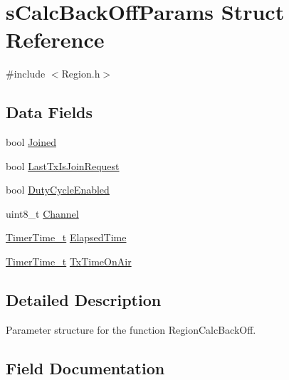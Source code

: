 \hypertarget{structsCalcBackOffParams}{}\section{s\+Calc\+Back\+Off\+Params Struct Reference}
\label{structsCalcBackOffParams}


{\ttfamily \#include $<$Region.\+h$>$}

\subsection*{Data Fields}
\begin{DoxyCompactItemize}
\item 
bool \hyperlink{structsCalcBackOffParams_aa738e3fae7d7ab3f38641f9b72707993}{Joined}
\item 
bool \hyperlink{structsCalcBackOffParams_a11dd44f1674947f4dffdf6b7d18f41a2}{Last\+Tx\+Is\+Join\+Request}
\item 
bool \hyperlink{structsCalcBackOffParams_a4bea532b6e9e4114703af8783638cd8f}{Duty\+Cycle\+Enabled}
\item 
uint8\+\_\+t \hyperlink{structsCalcBackOffParams_a99a6c0a03d4d1b28145baef240f769dd}{Channel}
\item 
\hyperlink{utilities_8h_a4215ca43d3e953099ea758ce428599d0}{Timer\+Time\+\_\+t} \hyperlink{structsCalcBackOffParams_a944eee5d4b307ea37de08f610004b484}{Elapsed\+Time}
\item 
\hyperlink{utilities_8h_a4215ca43d3e953099ea758ce428599d0}{Timer\+Time\+\_\+t} \hyperlink{structsCalcBackOffParams_a90a1f5a96d10105fc2229e5c76393fd0}{Tx\+Time\+On\+Air}
\end{DoxyCompactItemize}


\subsection{Detailed Description}
Parameter structure for the function Region\+Calc\+Back\+Off. 

\subsection{Field Documentation}
\mbox{\label{structsCalcBackOffParams_a99a6c0a03d4d1b28145baef240f769dd}} 
